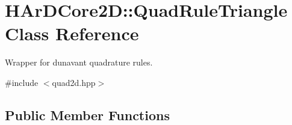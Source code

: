 \hypertarget{classHArDCore2D_1_1QuadRuleTriangle}{}\section{H\+Ar\+D\+Core2D\+:\+:Quad\+Rule\+Triangle Class Reference}
\label{classHArDCore2D_1_1QuadRuleTriangle}


Wrapper for dunavant quadrature rules.  




{\ttfamily \#include $<$quad2d.\+hpp$>$}

\subsection*{Public Member Functions}
